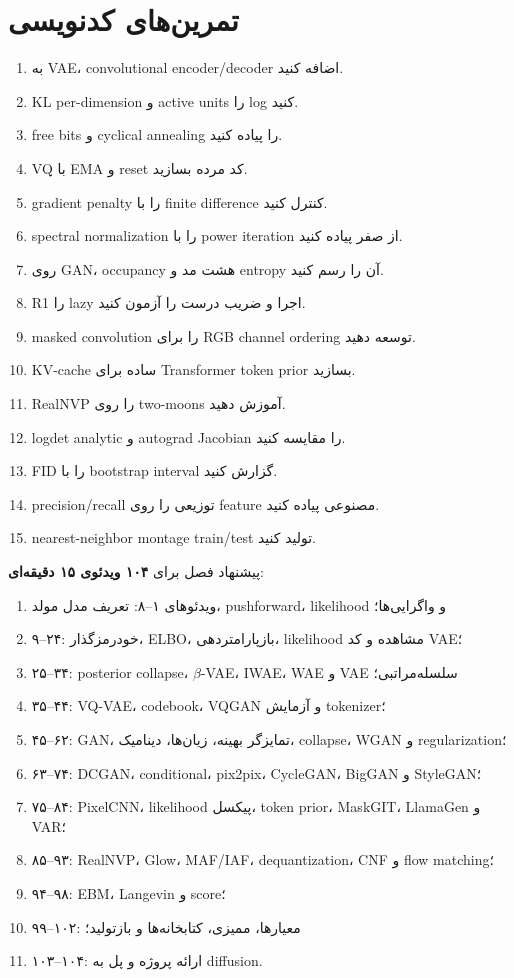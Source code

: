\documentclass[12pt,openany,oneside]{book}
\begin{document}
\section{تمرین‌های کدنویسی}
\begin{enumerate}
\item به VAE، convolutional encoder/decoder اضافه کنید.
\item KL per-dimension و active units را log کنید.
\item free bits و cyclical annealing را پیاده کنید.
\item VQ با EMA و reset کد مرده بسازید.
\item gradient penalty را با finite difference کنترل کنید.
\item spectral normalization را با power iteration از صفر پیاده کنید.
\item روی GAN، occupancy هشت مد و entropy آن را رسم کنید.
\item R1 را lazy اجرا و ضریب درست را آزمون کنید.
\item masked convolution را برای RGB channel ordering توسعه دهید.
\item KV-cache ساده برای Transformer token prior بسازید.
\item RealNVP را روی two-moons آموزش دهید.
\item logdet analytic و autograd Jacobian را مقایسه کنید.
\item FID را با bootstrap interval گزارش کنید.
\item precision/recall توزیعی را روی feature مصنوعی پیاده کنید.
\item nearest-neighbor montage train/test تولید کنید.
\end{enumerate}

\begin{videobox}
پیشنهاد فصل برای \textbf{۱۰۴ ویدئوی ۱۵ دقیقه‌ای}:
\begin{enumerate}
\item ویدئوهای ۱--۸: تعریف مدل مولد، pushforward، likelihood و واگرایی‌ها؛
\item ۹--۲۴: خودرمزگذار، ELBO، بازپارامتردهی، likelihood مشاهده و کد VAE؛
\item ۲۵--۳۴: posterior collapse، $\beta$-VAE، IWAE، WAE و VAE سلسله‌مراتبی؛
\item ۳۵--۴۴: VQ-VAE، codebook، VQGAN و آزمایش tokenizer؛
\item ۴۵--۶۲: GAN، تمایزگر بهینه، زیان‌ها، دینامیک، collapse، WGAN و regularization؛
\item ۶۳--۷۴: DCGAN، conditional، pix2pix، CycleGAN، BigGAN و StyleGAN؛
\item ۷۵--۸۴: PixelCNN، likelihood پیکسل، token prior، MaskGIT، LlamaGen و VAR؛
\item ۸۵--۹۳: RealNVP، Glow، MAF/IAF، dequantization، CNF و flow matching؛
\item ۹۴--۹۸: EBM، Langevin و score؛
\item ۹۹--۱۰۲: معیارها، ممیزی، کتابخانه‌ها و بازتولید؛
\item ۱۰۳--۱۰۴: ارائه پروژه و پل به diffusion.
\end{enumerate}
\end{videobox}
\end{document}
